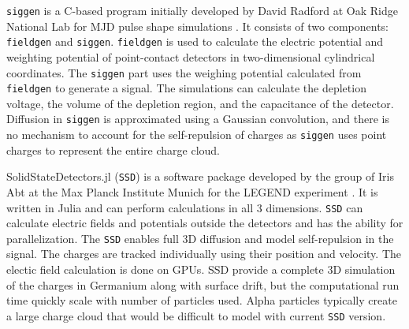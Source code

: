 \texttt{siggen} is a C-based program initially developed by David Radford at Oak Ridge National Lab for MJD pulse shape simulations \cite{siggen_paper}. It consists of two components: \texttt{fieldgen} and \texttt{siggen}. \texttt{fieldgen} is used to calculate the electric potential and weighting potential of point-contact detectors in two-dimensional cylindrical coordinates. The \texttt{siggen} part uses the weighing potential calculated from \texttt{fieldgen} to generate a signal. The simulations can calculate the depletion voltage, the volume of the depletion region, and the capacitance of the detector. Diffusion in \texttt{siggen} is approximated using a Gaussian convolution, and there is no mechanism to account for the self-repulsion of charges as \texttt{siggen} uses point charges to represent the entire charge cloud.



SolidStateDetectors.jl (\texttt{SSD}) is a software package developed by the group of Iris Abt at the Max Planck Institute Munich for the LEGEND experiment \cite{Abt:2021SSD}. It is written in Julia and can perform calculations in all 3 dimensions. \texttt{SSD} can calculate electric fields and potentials outside the detectors and has the ability for parallelization. The \texttt{SSD} enables full 3D diffusion and model self-repulsion in the signal. The charges are tracked individually using their position and velocity. The electic field calculation is done on GPUs. SSD provide a complete 3D simulation of the charges in Germanium along with surface drift, but the computational run time quickly scale with number of particles used. Alpha particles typically create a large charge cloud that would be difficult to model with current \texttt{SSD} version.


